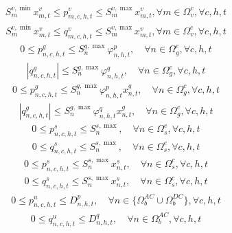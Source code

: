 \documentclass[a4paper,fleqn]{cas-dc}
\begin{document}
{\begin{align}
    \label{p_VSC_cdd}
    S_{m}^{v, \min} x_{m,t}^{v} \leq p_{m,c,h,t}^{v} \leq S_{m}^{v, \max} x_{m,t}^{v},
    \forall m \in \Omega_{v}^{c}, \forall c,h,t
\end{align}
\begin{align}
    \label{q_VSC_cdd}
    S_{m}^{v, \min} x_{m,t}^{v} \leq q_{m,c,h,t}^{v} \leq S_{m}^{v, \max} x_{m,t}^{v},
    \forall m \in \Omega_{v}^{c}, \forall c,h,t
\end{align}
\begin{align}
    \label{p_DG_ext}
    0 \leq p_{n,c,h,t}^{g} \leq S_{n}^{g, \max} \varphi_{n,h,t}^{p},
    \quad \forall n \in \Omega_{g}^{e}, \forall c,h,t
\end{align}
\begin{align}
    \label{q_DG_ext}
    \left| q_{n,c,h,t}^{g} \right| \leq 
    S_{n}^{g, \max} \varphi_{n,h,t}^{q},
    \quad \forall n \in \Omega_{g}^{e}, \forall c,h,t
\end{align}
\begin{align}
    \label{p_DG_cdd}
    0 \leq p_{n,c,h,t}^{g} \leq S_{n}^{g, \max} \varphi_{n,h,t}^{p} x_{n,t}^{g},
    \quad \forall n \in \Omega_{g}^{c}, \forall c,h,t
\end{align}
\begin{align}
    \label{q_DG_cdd}
    \left| q_{n,c,h,t}^{g} \right| \leq 
    S_{n}^{g, \max} \varphi_{n,h,t}^{q} x_{n,t}^{g},
    \quad \forall n \in \Omega_{g}^{c}, \forall c,h,t
\end{align}
\begin{align}
    \label{p_sub_ext}
    0 \leq p_{n,c,h,t}^{s} \leq S_{n}^{s, \max},
    \quad \forall n \in \Omega_{s}^{e}, \forall c,h,t
\end{align}
\begin{align}
    \label{q_sub_ext}
    0 \leq q_{n,c,h,t}^{s} \leq S_{n}^{s, \max},
    \quad \forall n \in \Omega_{s}^{e}, \forall c,h,t
\end{align}
\begin{align}
    \label{p_sub_cdd}
    0 \leq p_{n,c,h,t}^{s} \leq S_{n}^{s, \max} x_{n,t}^{s},
    \quad \forall n \in \Omega_{s}^{c}, \forall c,h,t
\end{align}
\begin{align}
    \label{q_sub_cdd}
    0 \leq q_{n,c,h,t}^{s} \leq S_{n}^{s, \max} x_{n,t}^{s},
    \quad \forall n \in \Omega_{s}^{c}, \forall c,h,t
\end{align}
\begin{align}
    \label{p_shed}
    0 \leq p_{n,c,h,t}^{u} \leq D_{n,h,t}^{p},
    \quad \forall n \in \{\Omega_{b}^{AC} \cup \Omega_{b}^{DC}\},
    \forall c,h,t
\end{align}
\begin{align}
    \label{q_shed}
    0 \leq q_{n,c,h,t}^{u} \leq D_{n,h,t}^{q},
    \quad \forall n \in \Omega_{b}^{AC},
    \forall c,h,t
\end{align}

}
\end{document}
